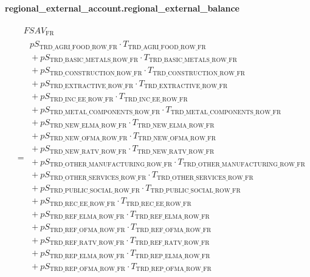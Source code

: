 \documentclass[11pt]{article}
\begin{document}
\paragraph{regional\_external\_account.regional\_external\_balance}
\begin{align*}
&\quad FSAV_{\text{FR}}\\
&= \begin{aligned}
pS_{\text{TRD\_AGRI\_FOOD\_ROW\_FR}} \cdot T_{\text{TRD\_AGRI\_FOOD\_ROW\_FR}}\\
{}+ pS_{\text{TRD\_BASIC\_METALS\_ROW\_FR}} \cdot T_{\text{TRD\_BASIC\_METALS\_ROW\_FR}}\\
{}+ pS_{\text{TRD\_CONSTRUCTION\_ROW\_FR}} \cdot T_{\text{TRD\_CONSTRUCTION\_ROW\_FR}}\\
{}+ pS_{\text{TRD\_EXTRACTIVE\_ROW\_FR}} \cdot T_{\text{TRD\_EXTRACTIVE\_ROW\_FR}}\\
{}+ pS_{\text{TRD\_INC\_EE\_ROW\_FR}} \cdot T_{\text{TRD\_INC\_EE\_ROW\_FR}}\\
{}+ pS_{\text{TRD\_METAL\_COMPONENTS\_ROW\_FR}} \cdot T_{\text{TRD\_METAL\_COMPONENTS\_ROW\_FR}}\\
{}+ pS_{\text{TRD\_NEW\_ELMA\_ROW\_FR}} \cdot T_{\text{TRD\_NEW\_ELMA\_ROW\_FR}}\\
{}+ pS_{\text{TRD\_NEW\_OFMA\_ROW\_FR}} \cdot T_{\text{TRD\_NEW\_OFMA\_ROW\_FR}}\\
{}+ pS_{\text{TRD\_NEW\_RATV\_ROW\_FR}} \cdot T_{\text{TRD\_NEW\_RATV\_ROW\_FR}}\\
{}+ pS_{\text{TRD\_OTHER\_MANUFACTURING\_ROW\_FR}} \cdot T_{\text{TRD\_OTHER\_MANUFACTURING\_ROW\_FR}}\\
{}+ pS_{\text{TRD\_OTHER\_SERVICES\_ROW\_FR}} \cdot T_{\text{TRD\_OTHER\_SERVICES\_ROW\_FR}}\\
{}+ pS_{\text{TRD\_PUBLIC\_SOCIAL\_ROW\_FR}} \cdot T_{\text{TRD\_PUBLIC\_SOCIAL\_ROW\_FR}}\\
{}+ pS_{\text{TRD\_REC\_EE\_ROW\_FR}} \cdot T_{\text{TRD\_REC\_EE\_ROW\_FR}}\\
{}+ pS_{\text{TRD\_REF\_ELMA\_ROW\_FR}} \cdot T_{\text{TRD\_REF\_ELMA\_ROW\_FR}}\\
{}+ pS_{\text{TRD\_REF\_OFMA\_ROW\_FR}} \cdot T_{\text{TRD\_REF\_OFMA\_ROW\_FR}}\\
{}+ pS_{\text{TRD\_REF\_RATV\_ROW\_FR}} \cdot T_{\text{TRD\_REF\_RATV\_ROW\_FR}}\\
{}+ pS_{\text{TRD\_REP\_ELMA\_ROW\_FR}} \cdot T_{\text{TRD\_REP\_ELMA\_ROW\_FR}}\\
{}+ pS_{\text{TRD\_REP\_OFMA\_ROW\_FR}} \cdot T_{\text{TRD\_REP\_OFMA\_ROW\_FR}}\\

\end{aligned}
\end{align*}
\end{document}
